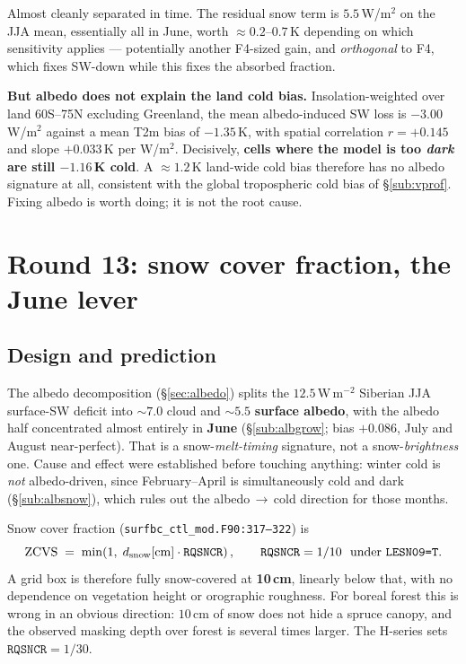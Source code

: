 \documentclass[10pt]{article}
\begin{document}
\noindent Almost cleanly separated in time. The residual snow term is $5.5$\,W/m$^2$ on the JJA
mean, essentially all in June, worth $\approx0.2$--$0.7$\,K depending on which sensitivity
applies --- potentially another F4-sized gain, and \emph{orthogonal} to F4, which fixes SW-down
while this fixes the absorbed fraction.

\textbf{But albedo does not explain the land cold bias.} Insolation-weighted over land
60S--75N excluding Greenland, the mean albedo-induced SW loss is $-3.00$\,W/m$^2$ against a mean
T2m bias of $-1.35$\,K, with spatial correlation $r=+0.145$ and slope $+0.033$\,K per W/m$^2$.
Decisively, \textbf{cells where the model is too \emph{dark} are still $-1.16$\,K cold}. A
$\approx1.2$\,K land-wide cold bias therefore has no albedo signature at all, consistent with
the global tropospheric cold bias of \S\ref{sub:vprof}. Fixing albedo is worth doing; it is not
the root cause.

\section{Round 13: snow cover fraction, the June lever}\label{sec:h}
\subsection{Design and prediction}\label{sub:hdesign}
The albedo decomposition (\S\ref{sec:albedo}) splits the $12.5$\,W\,m$^{-2}$ Siberian JJA
surface-SW deficit into ${\sim}7.0$ cloud and ${\sim}5.5$ \textbf{surface albedo}, with the
albedo half concentrated almost entirely in \textbf{June} (\S\ref{sub:albgrow}; bias $+0.086$,
July and August near-perfect). That is a snow-\emph{melt-timing} signature, not a
snow-\emph{brightness} one. Cause and effect were established before touching anything: winter
cold is \emph{not} albedo-driven, since February--April is simultaneously cold and dark
(\S\ref{sub:albsnow}), which rules out the albedo\,$\to$\,cold direction for those months.

Snow cover fraction (\texttt{surfbc\_ctl\_mod.F90:317--322}) is
\[ \mathrm{ZCVS} \;=\; \min\!\left(1,\; d_{\mathrm{snow}}[\mathrm{cm}] \cdot \mathtt{RQSNCR}\right),
\qquad \mathtt{RQSNCR} = 1/10 \ \ \text{under \texttt{LESN09=T}}. \]
A grid box is therefore fully snow-covered at \textbf{10\,cm}, linearly below that, with no
dependence on vegetation height or orographic roughness. For boreal forest this is wrong in an
obvious direction: $10$\,cm of snow does not hide a spruce canopy, and the observed masking
depth over forest is several times larger. The H-series sets $\mathtt{RQSNCR}=1/30$.
\end{document}
